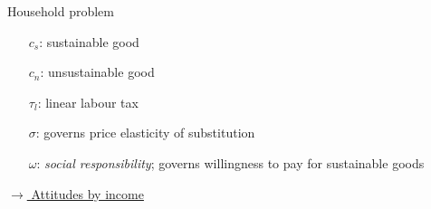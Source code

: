 \documentclass[11pt,aspectratio=169]{beamer}
\begin{document}
\begin{frame}{Household problem}
		\small
		\begin{minipage}[t!]{0.32\textwidth}
			\vspace{7mm}
			\begin{itemize}
				\item[] $c_s$: sustainable good \vspace{-2mm}
				\item[] $c_n$: unsustainable good\vspace{-2mm}
				\item[] $\tau_l$: linear labour tax
				\item[]
				\item[]
			\end{itemize}
		\end{minipage}
		\begin{minipage}[t!]{0.35\textwidth}
			\vspace{8mm}
			\begin{itemize}
				\item[$\sigma$:]  governs price elasticity of substitution%
				\vspace{-2mm}
				\item[$\omega$:] \textit{social responsibility}; governs willingness to pay for sustainable goods %
				\item[]	
			\end{itemize}
		\end{minipage}
		\begin{minipage}[t!]{0.4\textwidth}
			\vspace{7mm}
		\end{minipage}
		
		\vspace{-7mm}
		\hfill	\hyperlink{atts}{\tiny{$\rightarrow$ Attitudes by income}}
	\end{frame}
	
\end{document}

